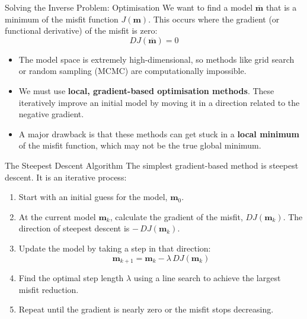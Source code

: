 \documentclass{beamer}
\begin{document}
\begin{frame}{Solving the Inverse Problem: Optimisation}
    We want to find a model $\overline{\mathbf{m}}$ that is a minimum of the misfit function $J(\mathbf{m})$. This occurs where the gradient (or functional derivative) of the misfit is zero:
    $$ DJ(\overline{\mathbf{m}}) = 0 $$
    \pause
    \begin{itemize}
        \item The model space is extremely high-dimensional, so methods like grid search or random sampling (MCMC) are computationally impossible.
        \pause
        \item We must use \textbf{local, gradient-based optimisation methods}. These iteratively improve an initial model by moving it in a direction related to the negative gradient.
        \pause
        \item A major drawback is that these methods can get stuck in a \textbf{local minimum} of the misfit function, which may not be the true global minimum.
    \end{itemize}
\end{frame}

\begin{frame}{The Steepest Descent Algorithm}
    The simplest gradient-based method is steepest descent. It is an iterative process:
    \pause
    \begin{enumerate}
        \item Start with an initial guess for the model, $\mathbf{m}_0$.
        \pause
        \item At the current model $\mathbf{m}_k$, calculate the gradient of the misfit, $DJ(\mathbf{m}_k)$. The direction of steepest descent is $-\,DJ(\mathbf{m}_k)$.
        \pause
        \item Update the model by taking a step in that direction:
        $$ \mathbf{m}_{k+1} = \mathbf{m}_k - \lambda \, DJ(\mathbf{m}_k) $$
        \pause
        \item Find the optimal step length $\lambda$ using a line search to achieve the largest misfit reduction.
        \pause
        \item Repeat until the gradient is nearly zero or the misfit stops decreasing.
    \end{enumerate}
\end{frame}

\end{document}
